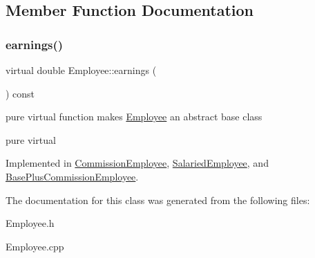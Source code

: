 \subsection{Member Function Documentation}
\mbox{\label{class_employee_a821a8bea1db657efc004670c8481cbae}} 
\subsubsection{\texorpdfstring{earnings()}{earnings()}}
{\footnotesize\ttfamily virtual double Employee\+::earnings (\begin{DoxyParamCaption}{ }\end{DoxyParamCaption}) const\hspace{0.3cm}{\ttfamily [pure virtual]}}



pure virtual function makes \mbox{\hyperlink{class_employee}{Employee}} an abstract base class 

pure virtual 

Implemented in \mbox{\hyperlink{class_commission_employee_aa7759d5908bd7357a9976c2c2740e9bb}{Commission\+Employee}}, \mbox{\hyperlink{class_salaried_employee_a917d254c8869beb7a3c1f1d0787b1515}{Salaried\+Employee}}, and \mbox{\hyperlink{class_base_plus_commission_employee_a79cefc4722f05de0e545c2f911e2dcab}{Base\+Plus\+Commission\+Employee}}.



The documentation for this class was generated from the following files\+:\begin{DoxyCompactItemize}
\item 
Employee.\+h\item 
Employee.\+cpp\end{DoxyCompactItemize}
